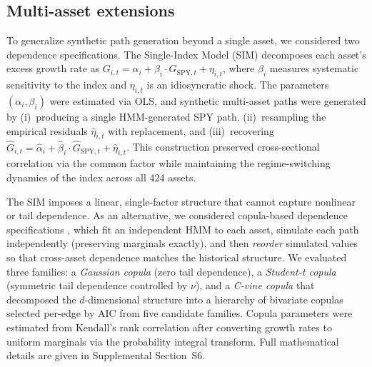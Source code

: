 \subsection*{Multi-asset extensions}
To generalize synthetic path generation beyond a single asset, we considered two dependence specifications. The Single-Index Model (SIM) \cite{sharpe_simplified_1963} decomposes each asset's excess growth rate as $G_{i,t} = \alpha_i + \beta_i \cdot G_{\text{SPY},t} + \eta_{i,t}$, where $\beta_i$ measures systematic sensitivity to the index and $\eta_{i,t}$ is an idiosyncratic shock. The parameters $(\alpha_i, \beta_i)$ were estimated via OLS, and synthetic multi-asset paths were generated by (i)~producing a single HMM-generated SPY path, (ii)~resampling the empirical residuals $\hat{\eta}_{i,t}$ with replacement, and (iii)~recovering $\hat{G}_{i,t} = \hat{\alpha}_i + \hat{\beta}_i \cdot \hat{G}_{\text{SPY},t} + \hat{\eta}_{i,t}$. This construction preserved cross-sectional correlation via the common factor while maintaining the regime-switching dynamics of the index across all 424 assets.

The SIM imposes a linear, single-factor structure that cannot capture nonlinear or tail dependence. As an alternative, we considered copula-based dependence specifications \cite{embrechts_copulas_2002, cherubini_copula_2004}, which fit an independent HMM to each asset, simulate each path independently (preserving marginals exactly), and then \emph{reorder} simulated values so that cross-asset dependence matches the historical structure. We evaluated three families: a \textit{Gaussian copula} (zero tail dependence), a \textit{Student-t copula} (symmetric tail dependence controlled by $\nu$), and a \textit{C-vine copula} \cite{aas_pair_2009} that decomposed the $d$-dimensional structure into a hierarchy of bivariate copulas selected per-edge by AIC from five candidate families. Copula parameters were estimated from Kendall's rank correlation after converting growth rates to uniform marginals via the probability integral transform. Full mathematical details are given in Supplemental Section~S6.